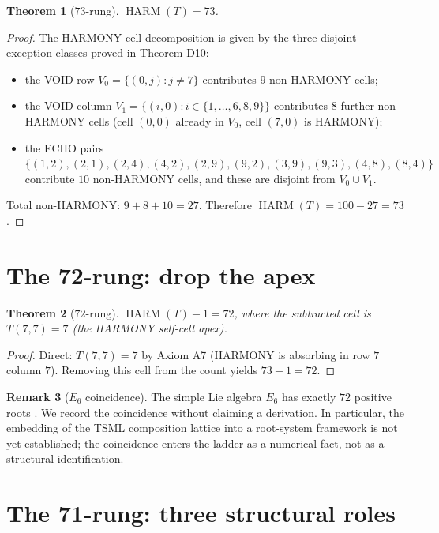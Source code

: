 \documentclass[11pt,reqno]{amsart}
\newtheorem{theorem}{Theorem}[section]
\theoremstyle{definition}
\newtheorem{remark}[theorem]{Remark}
\DeclareMathOperator{\HARM}{HARM}
\begin{document}
\begin{theorem}[$73$-rung]
\label{thm:73}
$\HARM(T) = 73$.
\end{theorem}

\begin{proof}
The HARMONY-cell decomposition is given by the three disjoint
exception classes proved in \cite{Sanders2026CLAxioms} Theorem D10:
\begin{itemize}[leftmargin=*]
\item the VOID-row $V_0 = \{(0, j) : j \neq 7\}$ contributes $9$ non-HARMONY cells;
\item the VOID-column $V_1 = \{(i, 0) : i \in \{1,\ldots,6,8,9\}\}$ contributes $8$ further non-HARMONY cells (cell $(0,0)$ already in $V_0$, cell $(7,0)$ is HARMONY);
\item the ECHO pairs $\{(1,2),(2,1),(2,4),(4,2),(2,9),(9,2),(3,9),(9,3),(4,8),(8,4)\}$ contribute $10$ non-HARMONY cells, and these are disjoint from $V_0 \cup V_1$.
\end{itemize}
Total non-HARMONY: $9 + 8 + 10 = 27$. Therefore
$\HARM(T) = 100 - 27 = 73$.
\end{proof}

\section{The 72-rung: drop the apex}
\label{sec:72}

\begin{theorem}[$72$-rung]
\label{thm:72}
$\HARM(T) - 1 = 72$, where the subtracted cell is $T(7, 7) = 7$
(the HARMONY self-cell apex).
\end{theorem}

\begin{proof}
Direct: $T(7, 7) = 7$ by Axiom A7 (HARMONY is absorbing in row $7$
column $7$). Removing this cell from the count yields $73 - 1 = 72$.
\end{proof}

\begin{remark}[$E_6$ coincidence]
\label{rem:e6}
The simple Lie algebra $E_6$ has exactly $72$ positive roots
\cite{Bourbaki1968,FultonHarris1991}. We record the coincidence
without claiming a derivation. In particular, the embedding of the
TSML composition lattice into a root-system framework is not yet
established; the coincidence enters the ladder as a numerical
fact, not as a structural identification.
\end{remark}

\section{The 71-rung: three structural roles}
\label{sec:71}
\end{document}
